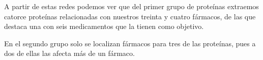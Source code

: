 A partir de estas redes podemos ver que del primer grupo de proteínas extraemos catorce proteínas relacionadas con nuestros treinta y cuatro fármacos, de las que destaca una con seis medicamentos que la tienen como objetivo.

En el segundo grupo solo se localizan fármacos para tres de las proteínas, pues a dos de ellas las afecta más de un fármaco.

\newpage
		